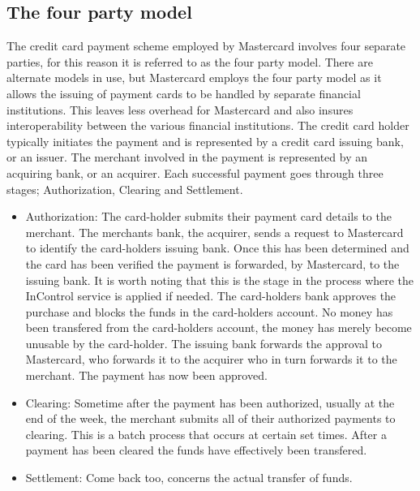 \documentclass[a4paper,12pt, titlepage]{article}
\begin{document}
\subsection{The four party model}
The credit card payment scheme employed by Mastercard involves four separate parties, for this reason it is referred to as the four party model. There are alternate models in use, but Mastercard employs the four party model as it allows the issuing of payment cards to be handled by separate financial institutions. This leaves less overhead for Mastercard and also insures interoperability between the various financial institutions. The credit card holder typically initiates the payment and is represented by a credit card issuing bank, or an issuer. The merchant involved in the payment is represented by an acquiring bank, or an acquirer. Each successful payment goes through three stages; Authorization, Clearing and Settlement.
\begin{itemize}
\item Authorization: The card-holder submits their payment card details to the merchant. The merchants bank, the acquirer, sends a request to Mastercard to identify the card-holders issuing bank. Once this has been determined and the card has been verified the payment is forwarded, by Mastercard, to the issuing bank. It is worth noting that this is the stage in the process where the InControl service is applied if needed. The card-holders bank approves the purchase and blocks the funds in the card-holders account. No money has been transfered from the card-holders account, the money has merely become unusable by the card-holder. The issuing bank forwards the approval to Mastercard, who forwards it to the acquirer who in turn forwards it to the merchant. The payment has now been approved. 
\item Clearing: Sometime after the payment has been authorized, usually at the end of the week, the merchant submits all of their authorized payments to clearing. This is a batch process that occurs at certain set times. After a payment has been cleared the funds have effectively been transfered.
\item Settlement: Come back too, concerns the actual transfer of funds.
\end{itemize}
\end{document}
